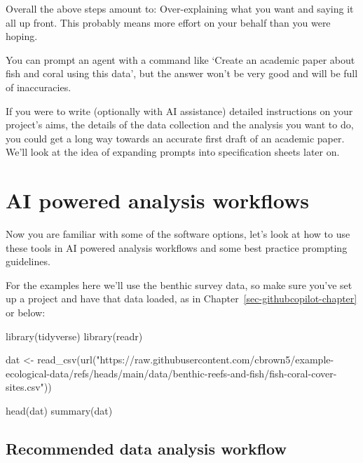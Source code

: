\documentclass[
  letterpaper,
  DIV=11,
  numbers=noendperiod]{scrreprt}
\newenvironment{Shaded}{\begin{snugshade}}{\end{snugshade}}
\newcommand{\FunctionTok}[1]{\textcolor[rgb]{0.28,0.35,0.67}{#1}}
\newcommand{\NormalTok}[1]{\textcolor[rgb]{0.00,0.23,0.31}{#1}}
\newcommand{\OtherTok}[1]{\textcolor[rgb]{0.00,0.23,0.31}{#1}}
\newcommand{\StringTok}[1]{\textcolor[rgb]{0.13,0.47,0.30}{#1}}
\begin{document}
Overall the above steps amount to: Over-explaining what you want and
saying it all up front. This probably means more effort on your behalf
than you were hoping.

You can prompt an agent with a command like `Create an academic paper
about fish and coral using this data', but the answer won't be very good
and will be full of inaccuracies.

If you were to write (optionally with AI assistance) detailed
instructions on your project's aims, the details of the data collection
and the analysis you want to do, you could get a long way towards an
accurate first draft of an academic paper. We'll look at the idea of
expanding prompts into specification sheets later on.


\chapter{AI powered analysis
workflows}\label{ai-powered-analysis-workflows}

Now you are familiar with some of the software options, let's look at
how to use these tools in AI powered analysis workflows and some best
practice prompting guidelines.

For the examples here we'll use the benthic survey data, so make sure
you've set up a project and have that data loaded, as in
Chapter~\ref{sec-githubcopilot-chapter} or below:

\begin{Shaded}
\begin{Highlighting}[]
\FunctionTok{library}\NormalTok{(tidyverse)}
\FunctionTok{library}\NormalTok{(readr)}

\NormalTok{dat }\OtherTok{\textless{}{-}} \FunctionTok{read\_csv}\NormalTok{(}\FunctionTok{url}\NormalTok{(}\StringTok{"https://raw.githubusercontent.com/cbrown5/example{-}ecological{-}data/refs/heads/main/data/benthic{-}reefs{-}and{-}fish/fish{-}coral{-}cover{-}sites.csv"}\NormalTok{))}

\FunctionTok{head}\NormalTok{(dat)}
\FunctionTok{summary}\NormalTok{(dat)}
\end{Highlighting}
\end{Shaded}

\section{Recommended data analysis
workflow}\label{recommended-data-analysis-workflow}
\end{document}
